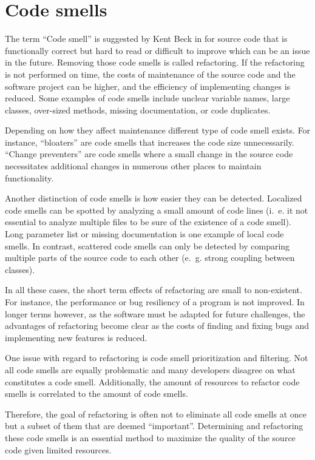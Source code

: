 \section{Code smells}\label{sec:code_smell}

The term \enquote{Code smell} is suggested by Kent Beck in \cite{fowler2019refactoring} for source code that is functionally correct but hard to read or difficult to improve which can be an issue in the future. Removing those code smells is called refactoring. If the refactoring is not performed on time, the costs of maintenance of the source code and the software project can be higher, and the efficiency of implementing changes is reduced. Some examples of code smells include unclear variable names, large classes, over-sized methods, missing documentation, or code duplicates. 

Depending on how they affect maintenance  different type of code smell exists. For instance, \enquote{bloaters} are code smells that increases the code size unnecessarily. \enquote{Change preventers} are code smells where a small change in the source code necessitates additional changes in numerous other places to maintain functionality. \cite{data_clumps_refactoring_guru}


Another distinction of code smells is how easier they can be detected. Localized code smells can be spotted by analyzing a small amount of code lines (i.~e. it not essential to analyze multiple files to be sure of the existence of a code smell). Long parameter list or missing documentation is one example of local code smells.  In contrast, scattered code smells can only be detected by comparing multiple parts of the source code to each other (e.~g. strong coupling between classes). \cite{10.1007/978-3-030-29238-6_19}

In all these cases, the short term effects of refactoring are small to non-existent. For instance, the performance or bug resiliency of a program is not improved. In longer terms however, as the software must be adapted for future challenges, the advantages of refactoring become clear as the costs of finding and fixing bugs and implementing new features is reduced. 

One issue with regard to refactoring is code smell prioritization and filtering. Not all code smells are equally problematic and many developers disagree on what constitutes a code smell. Additionally,  the amount of resources to refactor code smells is correlated to the amount of code smells. \cite{10.1007/978-981-13-8300-7_21}

Therefore, the goal of refactoring is often not to eliminate all code smells at once but a subset of them that are deemed \enquote{important}. Determining and refactoring these code smells is an essential method to maximize the quality of the source code  given limited resources. \cite{code_smell_prio} 